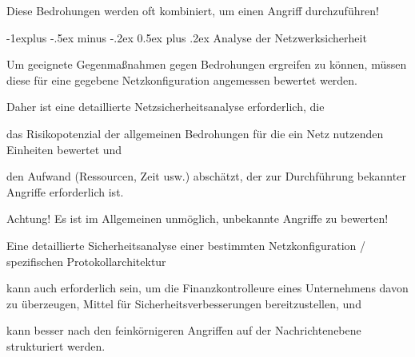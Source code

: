 \documentclass[a4paper]{article}
\makeatletter
\renewcommand{\subsection}{\@startsection{subsection}{2}{0mm}%
 {-1explus -.5ex minus -.2ex}%
 {0.5ex plus .2ex}%
 {\normalfont\normalsize\bfseries}}
\makeatother
\begin{document}
\begin{multicols}{3}
      Diese Bedrohungen werden oft kombiniert, um einen Angriff durchzuführen!



      \subsection{Analyse der
            Netzwerksicherheit}

      \begin{itemize*}
            \item
            Um geeignete Gegenmaßnahmen gegen Bedrohungen ergreifen zu können,
            müssen diese für eine gegebene Netzkonfiguration angemessen bewertet
            werden.
            \item
            Daher ist eine detaillierte Netzsicherheitsanalyse erforderlich, die

            \begin{itemize*}
                  \item das Risikopotenzial der allgemeinen Bedrohungen für die ein Netz nutzenden Einheiten bewertet und
                  \item den Aufwand (Ressourcen, Zeit usw.) abschätzt, der zur Durchführung bekannter Angriffe erforderlich ist.
                  \item Achtung! Es ist im Allgemeinen unmöglich, unbekannte Angriffe zu bewerten!
            \end{itemize*}
            \item
            Eine detaillierte Sicherheitsanalyse einer bestimmten
            Netzkonfiguration / spezifischen Protokollarchitektur

            \begin{itemize*}
                  \item kann auch erforderlich sein, um die Finanzkontrolleure eines Unternehmens davon zu überzeugen, Mittel für Sicherheitsverbesserungen bereitzustellen, und
                  \item kann besser nach den feinkörnigeren Angriffen auf der Nachrichtenebene strukturiert werden.
            \end{itemize*}
      \end{itemize*}



\end{multicols}
\end{document}
